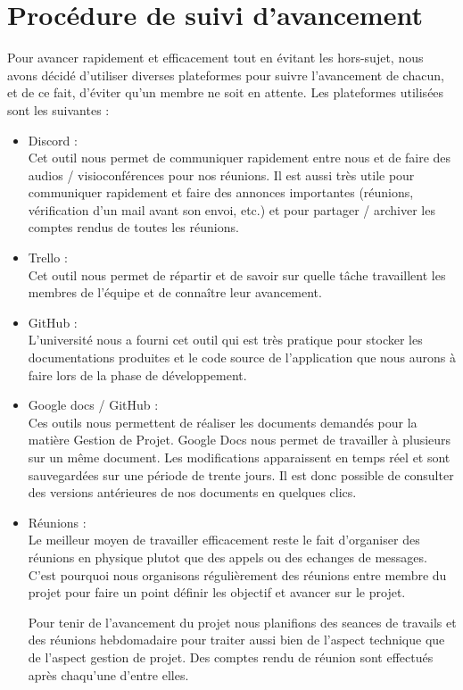 \chapter{Procédure de suivi d'avancement}

Pour avancer rapidement et efficacement tout en évitant les hors-sujet, nous avons
décidé d’utiliser diverses plateformes pour suivre l’avancement de chacun, et de ce fait,
d’éviter qu’un membre ne soit en attente. Les plateformes utilisées sont les suivantes :\\ \newline

\begin{itemize}
	\item Discord :\\
	Cet outil nous permet de communiquer rapidement entre nous et
de faire des audios / visioconférences pour nos réunions. Il est aussi très utile
pour communiquer rapidement et faire des annonces importantes (réunions,
vérification d’un mail avant son envoi, etc.) et pour partager / archiver les
comptes rendus de toutes les réunions.\\
	\item Trello :\\
	Cet outil nous permet de répartir et de savoir sur quelle tâche
travaillent les membres de l’équipe et de connaître leur avancement.\\
	\item GitHub :\\
	L’université nous a fourni cet outil qui est très pratique pour stocker
les documentations produites et le code source de l’application que nous
aurons à faire lors de la phase de développement.\\
	\item Google docs / GitHub :\\
	Ces outils nous permettent de réaliser les documents demandés
pour la matière Gestion de Projet. Google Docs nous permet de travailler à
plusieurs sur un même document. Les modifications apparaissent en temps
réel et sont sauvegardées sur une période de trente jours. Il est donc possible
de consulter des versions antérieures de nos documents en quelques clics.\\
	\item Réunions :\\
	Le meilleur moyen de travailler efficacement reste le fait d'organiser des réunions en physique 
	plutot que des appels ou des echanges de messages. C'est pourquoi nous organisons régulièrement des réunions
	entre membre du projet pour faire un point définir les objectif et avancer sur le projet. \newline

Pour tenir de l'avancement du projet nous planifions des seances de travails et des réunions hebdomadaire pour traiter
aussi bien de l'aspect technique que de l'aspect gestion de projet. Des comptes rendu de réunion sont effectués après chaqu'une d'entre elles.
\end{itemize}
